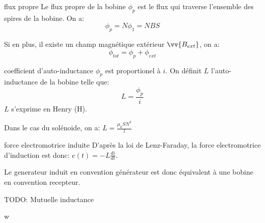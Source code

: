 \begin{definition}{flux propre}{}
    Le flux propre de la bobine $\phi_p$ est le flux qui traverse l'ensemble des spires de la bobine. On a:
    \[ \phi_p = N\phi_1 = NBS\]
\end{definition}

\begin{remark}{}{}
    Si en plus, il existe un champ magnétique extérieur $\vv{B_{ext}}$, on a:
    \[ \phi_{tot} = \phi_{p} + \phi_{ext} \]
\end{remark}

\begin{definition}{coefficient d'auto-inductance}{}
    $\phi_p$ est proportionel à $i$. On définit $L$ l'auto-inductance de la bobine telle que:
    \[ L = \frac{\phi_p}{i} \]
    $L$ s'exprime en Henry (H).
\end{definition}

\begin{remark}{}{}
    Dans le cas du solénoide, on a: $L = \frac{\mu_0 S N^2}{l}$
\end{remark}

\begin{proposition}{force electromotrice induite}{}
    D'après la loi de Lenz-Faraday, la force electromotrice d'induction est donc: $e(t) = -L\frac{di}{dt}$.

    Le generateur induit en convention générateur est donc équivalent à une bobine en convention recepteur.
\end{proposition}


TODO: Mutuelle inductance

w